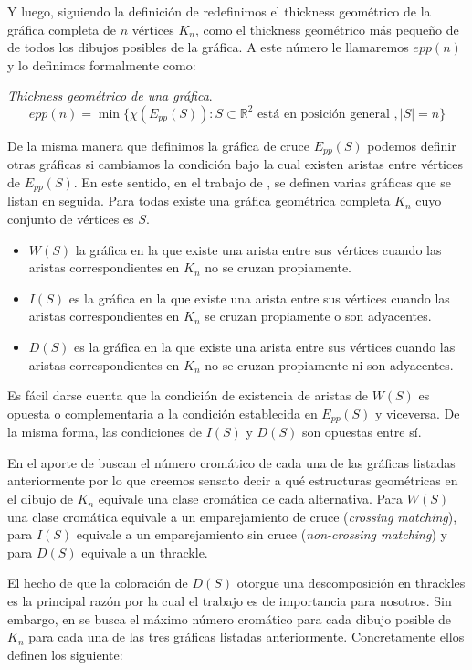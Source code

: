 Y luego, siguiendo la definición de \cite{Dillencourt2004} redefinimos el thickness
geométrico de la gráfica completa de $n$ vértices $K_n$, como el thickness geométrico
más pequeño de de todos los dibujos posibles de la gráfica.
A este número le llamaremos $epp(n)$ y lo definimos formalmente como:
\begin{definition}{\emph{Thickness geométrico de una gráfica}.}
  \[epp(n) = \min\{ \chi(E_{pp}(S)): S \subset \mathbb{R}^2 \text{ está en posición general }, |S|=n \}\]
\end{definition}

De la misma manera que definimos la gráfica de cruce $E_{pp}(S)$ podemos definir
otras gráficas si cambiamos la condición bajo la cual existen aristas entre vértices
de $E_{pp}(S)$. En este sentido, en el trabajo de \cite{Araujo2005}, se definen
varias gráficas que se listan en seguida. Para todas existe una gráfica geométrica
completa $K_n$ cuyo conjunto de vértices es $S$.
\begin{itemize}
  \item $W(S)$ la gráfica en la que existe una arista entre sus vértices
  cuando las aristas correspondientes en $K_n$ no se cruzan propiamente.
  \item $I(S)$ es la gráfica en la que existe una arista entre sus vértices
  cuando las aristas correspondientes en $K_n$ se cruzan propiamente o son adyacentes.
  \item $D(S)$ es la gráfica en la que existe una arista entre sus vértices
  cuando las aristas correspondientes en $K_n$ no se cruzan propiamente ni son adyacentes.
\end{itemize}

Es fácil darse cuenta que la condición de existencia de aristas de $W(S)$ es opuesta
o complementaria a la condición establecida en $E_{pp}(S)$ y viceversa. De la misma
forma, las condiciones de $I(S)$ y $D(S)$ son opuestas entre sí.

En el aporte de \cite{Araujo2005} buscan el número cromático de cada una de las
gráficas listadas anteriormente por lo que creemos sensato decir a qué estructuras
geométricas en el dibujo de $K_n$ equivale una clase cromática de cada alternativa.
Para $W(S)$ una clase cromática equivale a un emparejamiento de cruce (\emph{crossing matching}),
para $I(S)$ equivale a un emparejamiento sin cruce (\emph{non-crossing matching})
y para $D(S)$ equivale a un thrackle.

El hecho de que la coloración de $D(S)$ otorgue una descomposición en thrackles es la
principal razón por la cual el trabajo es de importancia para nosotros. Sin embargo,
en \cite{Araujo2005} se busca el máximo número cromático para cada dibujo posible
de $K_n$ para cada una de las tres gráficas listadas anteriormente. Concretamente
ellos definen los siguiente:

